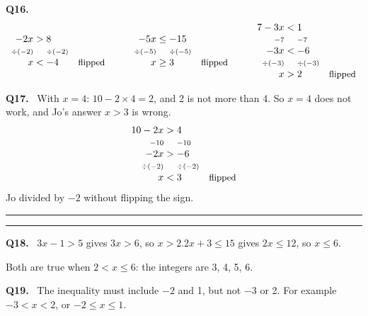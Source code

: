 \documentclass[12pt,a4paper]{article}
\newcommand{\wq}[1]{\par\addvspace{6pt}\noindent\textbf{Q#1.}\ }
\newcommand{\op}[1]{{\scriptstyle #1}}
\begin{document}
\wq{16}
\[
\begin{array}{r@{\;}c@{\;}l@{\quad}l}
  -2x & > & 8\\
  \op{\div(-2)} & & \op{\div(-2)}\\
  x & < & -4 & \text{\small flipped}
\end{array}
\qquad
\begin{array}{r@{\;}c@{\;}l@{\quad}l}
  -5x & \le & -15\\
  \op{\div(-5)} & & \op{\div(-5)}\\
  x & \ge & 3 & \text{\small flipped}
\end{array}
\qquad
\begin{array}{r@{\;}c@{\;}l@{\quad}l}
  7-3x & < & 1\\
  \op{-7} & & \op{-7}\\
  -3x & < & -6\\
  \op{\div(-3)} & & \op{\div(-3)}\\
  x & > & 2 & \text{\small flipped}
\end{array}
\]

\wq{17} With $x=4$: $10-2\times4=2$, and 2 is not more than 4. So $x=4$ does not work, and Jo's answer $x>3$ is wrong.
\[
\begin{array}{r@{\;}c@{\;}l@{\quad}l}
  10-2x & > & 4\\
  \op{-10} & & \op{-10}\\
  -2x & > & -6\\
  \op{\div(-2)} & & \op{\div(-2)}\\
  x & < & 3 & \text{\small flipped}
\end{array}
\]
Jo divided by $-2$ without flipping the sign.

\par\addvspace{10pt}
\noindent\rule{\linewidth}{0.8pt}\par\nobreak\vspace{1pt}
\par\nobreak\vspace{1pt}
\noindent\rule{\linewidth}{0.4pt}\par\nobreak\vspace{4pt}

\wq{18} $3x-1>5$ gives $3x>6$, so $x>2$.\quad $2x+3\le15$ gives $2x\le12$, so $x\le6$.

Both are true when $2<x\le6$: the integers are 3, 4, 5, 6.

\wq{19} The inequality must include $-2$ and 1, but not $-3$ or 2. For example $-3<x<2$, or $-2\le x\le1$.
\end{document}

